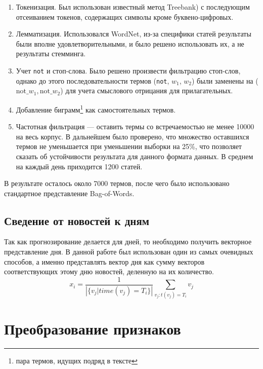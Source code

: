 \documentclass[14pt,a4paper]{extreport}
\begin{document}
\begin{enumerate}

\item Токенизация. Был использован известный метод Treebank\cite{treebank}) с последующим отсеиванием токенов,
содержащих символы кроме буквено-цифровых.
\item Лемматизация. Использовался WordNet\cite{wordnet}, из-за специфики статей результаты были вполне удовлетворительными,
и было решено использовать их, а не результаты стемминга.
\item Учет \texttt{not} и стоп-слова. Было решено произвести фильтрацию стоп-слов, однако до этого последовательности
термов (\texttt{not}, $w_1$, $w_2$) были заменены на ($\text{not\_} w_1, \text{not\_} w_2$) для учета смыслового отрицания
для прилагательных.
\item Добавление биграмм\footnote{пара термов, идущих подряд в тексте} как самостоятельных термов.
\item Частотная фильтрация --- оставить термы со встречаемостью не менее 10000 на весь корпус. В дальнейшем было проверено,
что множество оставшихся термов не уменьшается при уменьшении выборки на 25\%, что позволяет сказать об устойчивости
результата для данного формата данных. В среднем на каждый день приходится 1200 статей.

\end{enumerate}

В результате осталось около 7000 термов, после чего было использовано стандартное представление Bag-of-Words.

\subsection{Сведение от новостей к дням}

Так как прогнозирование делается для дней, то необходимо получить векторное представление дня.
В данной работе был использован один из самых очевидных способов, а именно представлять вектор дня как сумму векторов соответствующих этому дню новостей, деленную на их количество.
\begin{equation}
x_i = \frac{1}{\left|\{v_j | time(v_j)=T_i\}\right|} \sum_{v_j: t(v_j)=T_i} v_j
\end{equation}

\section{Преобразование признаков}
\end{document}
